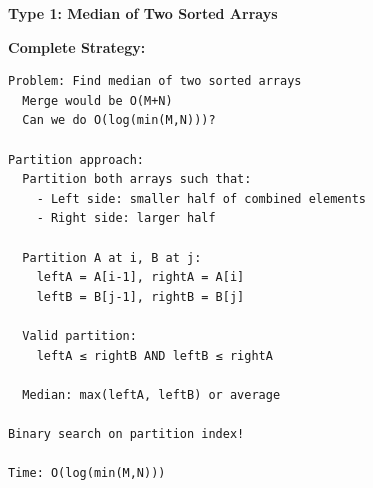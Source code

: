 \documentclass[11pt,a4paper,oneside]{book}
\begin{document}
\begin{tcolorbox}[
    enhanced,breakable,
    colback=warnyellow!10,
    colframe=warnyellow,
    boxrule=2pt,
    arc=4mm,
    title=\textbf{Complete Two Array Median Algorithms}
]
\textbf{Type 1: Median of Two Sorted Arrays}

\textbf{Complete Strategy:}
\begin{verbatim}
Problem: Find median of two sorted arrays
  Merge would be O(M+N)
  Can we do O(log(min(M,N)))?

Partition approach:
  Partition both arrays such that:
    - Left side: smaller half of combined elements
    - Right side: larger half
  
  Partition A at i, B at j:
    leftA = A[i-1], rightA = A[i]
    leftB = B[j-1], rightB = B[j]
  
  Valid partition:
    leftA ≤ rightB AND leftB ≤ rightA
  
  Median: max(leftA, leftB) or average

Binary search on partition index!

Time: O(log(min(M,N)))
\end{verbatim}
\end{tcolorbox}
\end{document}
